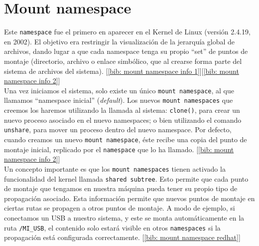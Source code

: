 \documentclass[a4paper, oneside, 12pt]{book}
\begin{document}
	\pagebreak
	
	\section{Mount namespace}
	\noindent Este \texttt{namespace} fue el primero en aparecer en el Kernel de Linux (versión 2.4.19, en 2002). El objetivo era restringir la visualización de la jerarquía global de archivos, dando lugar a que cada namespace tenga su propio ``set'' de puntos de montaje (directorio, archivo o enlace simbólico, que al crearse forma parte del sistema de archivos del sistema). [\ref{bib: mount namespace info 1}][\ref{bib: mount namespace info 2}] \\
	
	\noindent Una vez iniciamos el sistema, solo existe un único \texttt{mount namespace}, al que llamamos ``namespace inicial'' (\textit{default}). Los nuevos \texttt{mount namespaces} que creemos los haremos utilizando la llamada al sistema: \texttt{clone()}, para crear un nuevo proceso asociado en el nuevo namespaces; o bien utilizando el comando \texttt{unshare}, para mover un proceso dentro del nuevo namespace. Por defecto, cuando creamos un nuevo \texttt{mount namespace}, éste recibe una copia del punto de montaje inicial, replicado por el \texttt{namespace} que lo ha llamado. [\ref{bib: mount namespace info 2}] \\
	
	\noindent Un concepto importante es que los \texttt{mount namespaces} tienen activado la funcionalidad del kernel llamada \texttt{shared subtree}. Esto permite que cada punto de montaje que tengamos en nuestra máquina pueda tener su propio tipo de propagación asociado. Esta información permite que nuevos puntos de montaje en ciertas rutas se propagen a otros puntos de montaje. A modo de ejemplo, si conectamos un USB a nuestro sistema, y este se monta automáticamente en la ruta \texttt{/MI\_USB}, el contenido solo estará visible en otros \texttt{namespaces} si la propagación está configurada correctamente. [\ref{bib: mount namespace redhat}] \\
	
	
\end{document}
